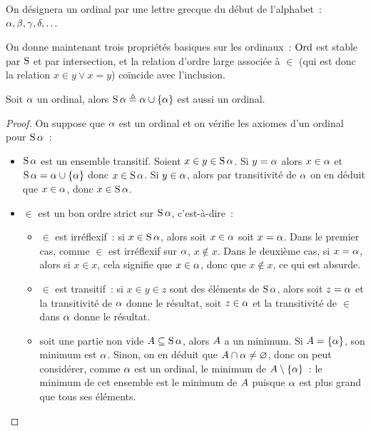 \begin{notation}
  On désignera un ordinal par une lettre grecque du début de l'alphabet~:
  $\alpha,\beta,\gamma,\delta,\ldots$
\end{notation}

On donne maintenant trois propriétés basiques sur les ordinaux~: $\operatorname{Ord}$ est
stable par $\operatorname{S}$ et par intersection, et la relation d'ordre large associée à
$\in$ (qui est donc la relation $x \in y \lor x = y$) coïncide avec l'inclusion.

\begin{proposition}
  Soit $\alpha$ un ordinal, alors $\operatorname{S}\alpha \triangleq \alpha\cup\{\alpha\}$ est
  aussi un ordinal.
\end{proposition}

\begin{proof}
  On suppose que $\alpha$ est un ordinal et on vérifie les axiomes d'un ordinal
  pour $\operatorname{S}\alpha$~:
  \begin{itemize}
  \item $\operatorname{S}\alpha$ est un ensemble transitif. Soient $x\in y\in \operatorname{S}\alpha$.
    Si $y = \alpha$ alors $x \in \alpha$ et
    $\operatorname{S}\alpha = \alpha \cup\{\alpha\}$ donc $x\in \operatorname{S}\alpha$. Si
    $y \in \alpha$, alors par transitivité de $\alpha$
    on en déduit que $x\in \alpha$, donc $x\in \operatorname{S}\alpha$.
  \item $\in$ est un bon ordre strict sur $\operatorname{S}\alpha$, c'est-à-dire~:
    \begin{itemize}
    \item $\in$ est irréflexif~: si $x\in \operatorname{S}\alpha$, alors soit $x\in\alpha$
      soit $x = \alpha$. Dans le premier cas, comme $\in$ est irréflexif sur
      $\alpha$, $x\notin x$. Dans le deuxième cas, si $x = \alpha$, alors
      si $x \in x$, cela signifie que $x \in \alpha$, donc que $x\notin x$, ce
      qui est absurde.
    \item $\in$ est transitif~: si $x \in y \in z$ sont des éléments de
      $\operatorname{S}\alpha$, alors soit $z = \alpha$ et la transitivité de $\alpha$
      donne le résultat, soit $z \in \alpha$ et la transitivité de $\in$ dans
      $\alpha$ donne le résultat.
    \item soit une partie non vide $A\subseteq \operatorname{S}\alpha$, alors $A$ a
      un minimum. Si $A = \{\alpha\}$, son minimum est $\alpha$. Sinon, on
      en déduit que $A\cap \alpha \neq\varnothing$, donc on peut considérer,
      comme $\alpha$ est un ordinal, le minimum de
      $A\setminus \{\alpha\}$~: le minimum de cet ensemble est le minimum
      de $A$ puisque $\alpha$ est plus grand que tous ses éléments.
      \qedhere
    \end{itemize}
  \end{itemize}
\end{proof}

